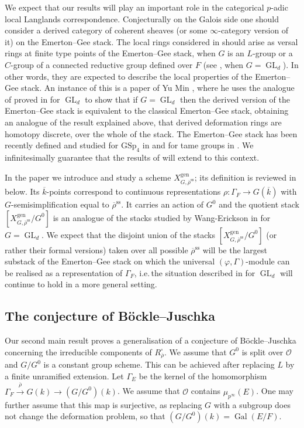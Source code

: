 \documentclass{amsart}
\theoremstyle{definition}
\theoremstyle{remark}
\DeclareMathOperator{\GL}{GL}
\DeclareMathOperator{\Gal}{Gal}
\newcommand{\OO}{\mathcal O}
\newcommand{\rhobar}{\overline{\rho}}
\newcommand{\gen}{\mathrm{gen}}
\newcommand{\kbar}{\overline{k}}
\newcommand{\rhobarss}{\rhobar^{\mathrm{ss}}}
\begin{document}
We expect that our results will play an important role in the categorical
$p$-adic local Langlands correspondence. Conjecturally 
\cite[Conjecture 6.1.14]{padic_LL} on the Galois side one should 
consider a derived category of coherent sheaves (or some $\infty$-category 
version of it) on the Emerton--Gee stack. 
The local rings considered in  should arise as 
versal rings at finite type points of the Emerton--Gee stack, when $G$
is an $L$-group or a $C$-group of a connected reductive 
group defined over $F$ (see \cite[Proposition 3.6.3]{EG_stack}, when $G=\GL_d$). In other words, they are expected to describe the 
local properties of the Emerton--Gee stack. An instance of this is 
a paper of Yu Min \cite{yu_min}, where he uses the analogue of  
proved in \cite{BIP_new} for $\GL_d$ 
to show that if $G=\GL_d$ then the derived version of the Emerton--Gee 
stack is equivalent to the classical Emerton--Gee stack, obtaining 
an analogue of the result explained above, that 
derived deformation rings are homotopy discrete, over the whole of the stack. The
Emerton--Gee stack has been recently defined and studied for $\mathrm{GSp}_4$ in \cite{heejong_lee} and for
tame groups in \cite{lin}.
We infinitesimally guarantee that the results of \cite{yu_min} will extend 
to this context. 

In the paper we introduce and study a scheme $X^{\gen}_{G, \rhobarss}$;
its definition is reviewed in  below.
Its $\kbar$-points correspond to continuous representations 
$\rho:\Gamma_F\rightarrow G(\kbar)$ with $G$-semisimplification 
equal to $\rhobarss$. It carries an 
action of $G^0$ and the quotient stack $[X^{\gen}_{G, \rhobarss}/ G^0]$
is an analogue of the stacks studied by Wang-Erickson in \cite{WE_alg}
for $G=\GL_d$. We expect that the disjoint union 
of the stacks $[X^{\gen}_{G, \rhobarss}/ G^0]$ (or rather their formal 
versions) taken over all possible 
$\rhobarss$ will be the largest substack of the Emerton--Gee stack
on which the universal $(\varphi, \Gamma)$-module can be realised
as a representation of $\Gamma_F$, i.e.\,the situation described 
in \cite[Remark 6.7.4]{EG_stack} for $\GL_d$ will continue to hold 
in a more general setting.

\subsection{The conjecture of B\"ockle--Juschka}
Our second main result proves a generalisation of a conjecture 
of B\"ockle--Juschka concerning  the irreducible components of $R^{\square}_{\rhobar}$.
We assume that $G^0$ is split over $\OO$ and $G/G^0$ is a constant group scheme. 
This can be achieved after replacing $L$ by a finite unramified extension. 
Let $\Gamma_E$ be the kernel of the homomorphism 
$\Gamma_F\overset{\rhobar}{\longrightarrow} G(k) \rightarrow (G/G^0)(k)$. 
We assume that $\OO$ contains $\mu_{p^{\infty}}(E)$. 
One may further assume that this map is surjective, as replacing 
$G$ with a subgroup does not change the 
deformation problem, so that $(G/G^0)(k)= \Gal(E/F)$. 
\end{document}
